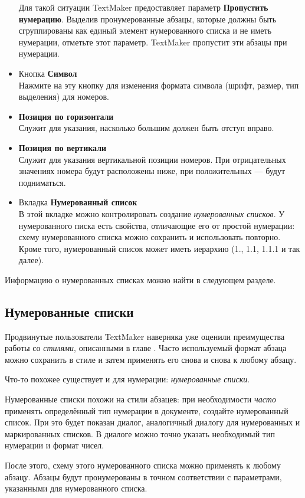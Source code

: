 ﻿\documentclass[a4paper,10pt]{article}
\begin{document}
\begin{itemize}
 Для такой ситуации TextMaker предоставляет параметр \textbf{Пропустить нумерацию}. Выделив пронумерованные абзацы, которые должны быть сгруппированы как единый элемент нумерованного списка и не иметь нумерации, отметьте этот параметр. TextMaker пропустит эти абзацы при нумерации.
 \item Кнопка \textbf{Символ}\\
 Нажмите на эту кнопку для изменения формата символа (шрифт, размер, тип выделения) для номеров.
 \item \textbf{Позиция по горизонтали}\\
 Служит для указания, насколько большим должен быть отступ вправо.
 \item \textbf{Позиция по вертикали}\\
 Служит для указания вертикальной позиции номеров. При отрицательных значениях номера будут расположены ниже, при положительных — будут подниматься.
 \item Вкладка \textbf{Нумерованный список}\\
 В этой вкладке можно контролировать создание \textit{нумерованных списков}. У нумерованного писка есть свойства, отличающие его от простой нумерации: схему нумерованного списка можно сохранить и использовать повторно. Кроме того, нумерованный список может иметь иерархию (1., 1.1, 1.1.1 и так далее).
\end{itemize}

Информацию о нумерованных списках можно найти в следующем разделе.

\subsection{Нумерованные списки} \label{sec:нумерованныесписки}
Продвинутые пользователи TextMaker наверняка уже оценили преимущества работы со \textit{стилями}, описанными в главе . Часто используемый формат абзаца можно сохранить в стиле и затем применять его снова и снова к любому абзацу.

Что-то похожее существует и для нумерации: \textit{нумерованные списки}.

Нумерованные списки похожи на стили абзацев: при необходимости \textit{часто} применять определённый тип нумерации в документе, создайте нумерованный список. При это будет показан диалог, аналогичный диалогу для нумерованных и маркированных списков. В диалоге можно точно указать необходимый тип нумерации и формат чисел.

После этого, схему этого нумерованного списка можно применять к любому абзацу. Абзацы будут пронумерованы в точном соответствии с параметрами, указанными для нумерованного списка.
\end{document}
